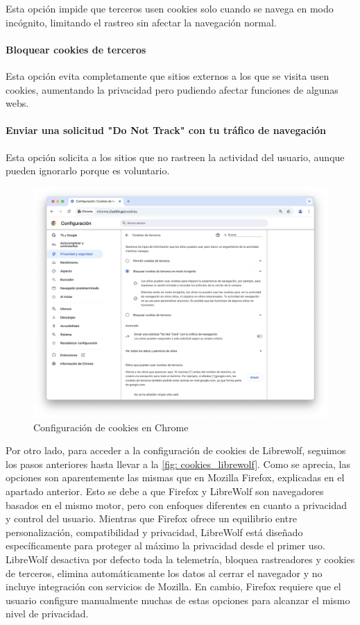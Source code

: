 Esta opción impide que terceros usen cookies solo cuando se navega en modo incógnito, limitando el rastreo sin afectar la navegación normal. 

\paragraph{Bloquear cookies de terceros}

Esta opción evita completamente que sitios externos a los que se visita usen cookies, aumentando la privacidad pero pudiendo afectar funciones de algunas webs. 

\paragraph{Enviar una solicitud "Do Not Track" con tu tráfico de navegación }

Esta opción solicita a los sitios que no rastreen la actividad del usuario, aunque pueden ignorarlo porque es voluntario. 

\begin{figure}[H]   
    \includegraphics[width=\textwidth]{cookies_chrome_ej14a.png}
    \caption{Configuración de cookies en Chrome}
    \label{fig:cookies_chrome}
\end{figure}

Por otro lado, para acceder a la configuración de cookies de Librewolf, seguimos los pasos anteriores hasta llevar a la \ref{fig: cookies_librewolf}. Como se aprecia, las opciones son aparentemente las mismas que en Mozilla Firefox, explicadas en el apartado anterior. Esto se debe a que Firefox y LibreWolf son navegadores basados en el mismo motor, pero con enfoques diferentes en cuanto a privacidad y control del usuario. Mientras que Firefox ofrece un equilibrio entre personalización, compatibilidad y privacidad, LibreWolf está diseñado específicamente para proteger al máximo la privacidad desde el primer uso. LibreWolf desactiva por defecto toda la telemetría, bloquea rastreadores y cookies de terceros, elimina automáticamente los datos al cerrar el navegador y no incluye integración con servicios de Mozilla. En cambio, Firefox requiere que el usuario configure manualmente muchas de estas opciones para alcanzar el mismo nivel de privacidad. 

